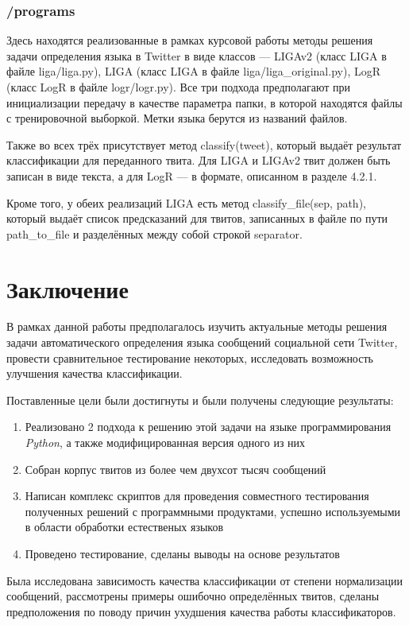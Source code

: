 \documentclass[a4paper, 14pt]{article}
\begin{document}
			\subsubsection{/programs}
				Здесь находятся реализованные в рамках курсовой работы методы решения задачи определения языка в Twitter в виде классов --- LIGAv2 (класс LIGA в файле liga/liga.py), LIGA (класс LIGA в файле liga/liga_original.py), LogR (класс LogR в файле logr/logr.py). Все три подхода
				предполагают при инициализации передачу в качестве параметра папки, в которой находятся файлы с тренировочной выборкой. Метки языка
				берутся из названий файлов.
				
				Также во всех трёх присутствует метод classify(tweet), который выдаёт результат классификации для переданного твита. Для LIGA и LIGAv2 твит должен быть записан в виде текста, а для LogR --- в формате, описанном в разделе 4.2.1.
				
				Кроме того, у обеих реализаций LIGA есть метод classify_file(sep, path), который выдаёт список предсказаний для твитов,
				записанных в файле по пути path_to_file и разделённых между собой строкой separator.

\pagebreak
	
\section{Заключение}
		В рамках данной работы предполагалось изучить актуальные методы решения задачи автоматического определения языка сообщений социальной сети Twitter, провести сравнительное тестирование некоторых, исследовать возможность улучшения качества классификации. 
		
		Поставленные цели были достигнуты и были получены следующие результаты:
		\begin{enumerate}
			\item Реализовано 2 подхода к решению этой задачи на языке программирования \textit{Python}, а также модифицированная версия одного из них
			\item Собран корпус твитов из более чем двухсот тысяч сообщений
			\item Написан комплекс скриптов для проведения совместного тестирования полученных решений с программными продуктами, успешно используемыми в области обработки естественых языков
			\item Проведено тестирование, сделаны выводы на основе результатов
		\end{enumerate}
		Была исследована зависимость качества классификации от степени нормализации сообщений, 
		рассмотрены примеры ошибочно определённых твитов, сделаны предположения по поводу причин ухудшения качества работы классификаторов.
		
\end{document}
